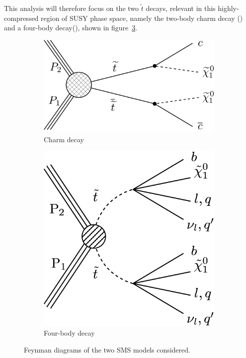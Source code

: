 This analysis will therefore focus on the two $\tilde{t}$ decays, relevant in
this highly-compressed region of SUSY phase space, namely the two-body charm decay
(\Ttwocc) and a four-body decay(\Ttwodegen), shown in figure~\ref{fig:model_feynman}.

\begin{figure}[h!]
  \centering
  \hspace*{\fill}%
  \begin{subfigure}{0.35\textwidth}
    \includegraphics[width=\textwidth]{Figs/feynman/T2cc_feynman_new.pdf}
    \caption{Charm decay}
    \label{fig:t2cc_feyn}
  \end{subfigure}
  \hfill
  \begin{subfigure}{0.35\textwidth}
    \includegraphics[width=\textwidth]{Figs/feynman/T2DegenerateStop_feyn.png}
    \caption{Four-body decay}
    \label{fig:t2degen_feyn}
  \end{subfigure}
  \hspace*{\fill}%
  \caption{Feynman diagrams of the two SMS models considered.}
  \label{fig:model_feynman}
\end{figure}


